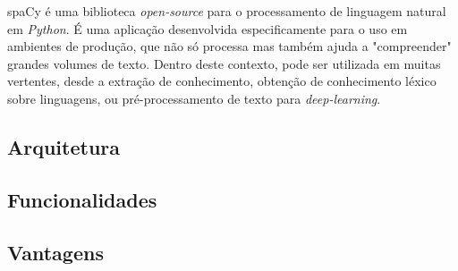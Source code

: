 \documentclass[12pt]{article}
\begin{document}
spaCy é uma biblioteca \textit{open-source} para o processamento de linguagem natural em \textit{Python}. É uma aplicação desenvolvida especificamente para o uso em ambientes
de produção, que não só processa mas também ajuda a "compreender" grandes volumes de texto. Dentro deste contexto, pode ser utilizada em muitas vertentes, desde a extração de
conhecimento, obtenção de conhecimento léxico sobre linguagens, ou pré-processamento de texto para \textit{deep-learning}.


\subsection{Arquitetura} %


\subsection{Funcionalidades}








\subsection{Vantagens} %
\end{document}

